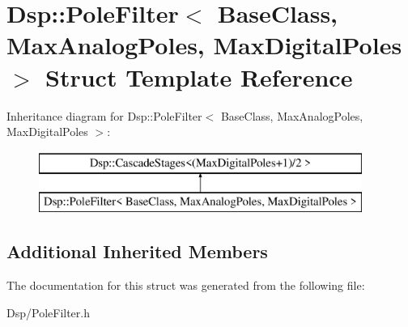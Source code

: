 \hypertarget{structDsp_1_1PoleFilter}{\section{Dsp\-:\-:Pole\-Filter$<$ Base\-Class, Max\-Analog\-Poles, Max\-Digital\-Poles $>$ Struct Template Reference}
\label{structDsp_1_1PoleFilter}
}
Inheritance diagram for Dsp\-:\-:Pole\-Filter$<$ Base\-Class, Max\-Analog\-Poles, Max\-Digital\-Poles $>$\-:\begin{figure}[H]
\begin{center}
\leavevmode
\includegraphics[height=2.000000cm]{structDsp_1_1PoleFilter}
\end{center}
\end{figure}
\subsection*{Additional Inherited Members}


The documentation for this struct was generated from the following file\-:\begin{DoxyCompactItemize}
\item 
Dsp/Pole\-Filter.\-h\end{DoxyCompactItemize}
